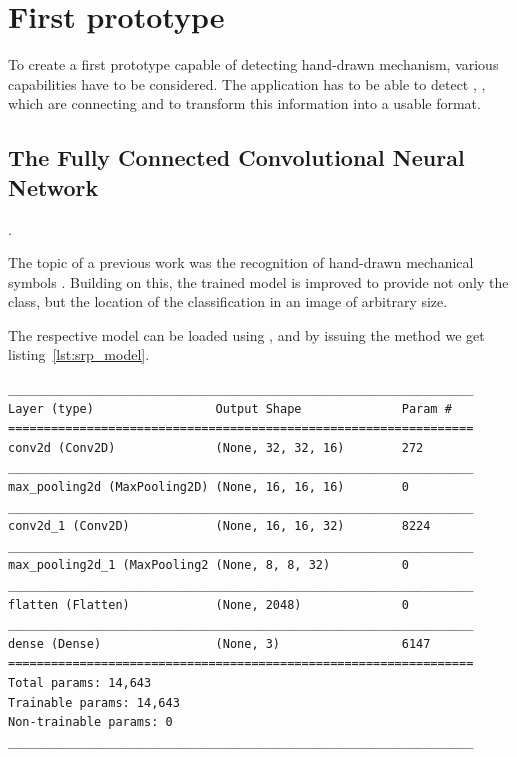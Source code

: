 \section{First prototype} \label{ch:first_prototype}

To create a first prototype capable of detecting hand-drawn mechanism, various capabilities have to be considered.
The application has to be able to detect , , which are connecting  and to transform this information into a usable format.

\subsection{The Fully Connected Convolutional Neural Network}.

The topic of a previous work was the recognition of hand-drawn mechanical symbols \cite{Lawrence2020}.
Building on this, the trained model is improved to provide not only the class, but the location of the classification in an image of arbitrary size.

The respective model can be loaded using , %
 and by issuing the  method we get listing~\ref{lst:srp_model}.

\begin{lstlisting}[caption={Summary of Symbol Classifier}, label={lst:srp_model}]
_________________________________________________________________
Layer (type)                 Output Shape              Param #
=================================================================
conv2d (Conv2D)              (None, 32, 32, 16)        272
_________________________________________________________________
max_pooling2d (MaxPooling2D) (None, 16, 16, 16)        0
_________________________________________________________________
conv2d_1 (Conv2D)            (None, 16, 16, 32)        8224
_________________________________________________________________
max_pooling2d_1 (MaxPooling2 (None, 8, 8, 32)          0
_________________________________________________________________
flatten (Flatten)            (None, 2048)              0
_________________________________________________________________
dense (Dense)                (None, 3)                 6147
=================================================================
Total params: 14,643
Trainable params: 14,643
Non-trainable params: 0
_________________________________________________________________
\end{lstlisting}

